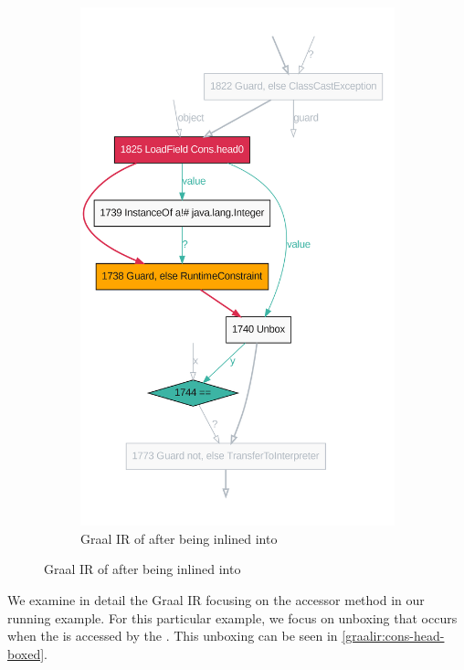 \begin{figure}[!htb]
\begin{subfigure}[b]{0.45\textwidth}
		\includegraphics[width=\textwidth]{figures/dot/List.contains.boxed.TruffleTier.png}
		\caption{Graal IR of  after being inlined into }
		\label{graalir:cons-contains-head-focus-boxed}
	\end{subfigure}
	\hfill
\end{figure}

We examine in detail the Graal IR focusing on the  accessor method in our  running example.
For this particular example, we focus on unboxing that occurs when the  is accessed by the .
This unboxing can be seen in \ref{graalir:cons-head-boxed}.

